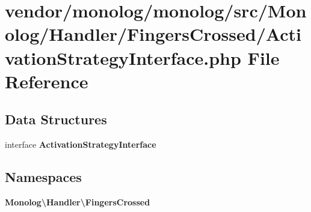 \section{vendor/monolog/monolog/src/\+Monolog/\+Handler/\+Fingers\+Crossed/\+Activation\+Strategy\+Interface.php File Reference}
\label{_activation_strategy_interface_8php}
\subsection*{Data Structures}
\begin{DoxyCompactItemize}
\item 
interface {\bf Activation\+Strategy\+Interface}
\end{DoxyCompactItemize}
\subsection*{Namespaces}
\begin{DoxyCompactItemize}
\item 
 {\bf Monolog\textbackslash{}\+Handler\textbackslash{}\+Fingers\+Crossed}
\end{DoxyCompactItemize}
